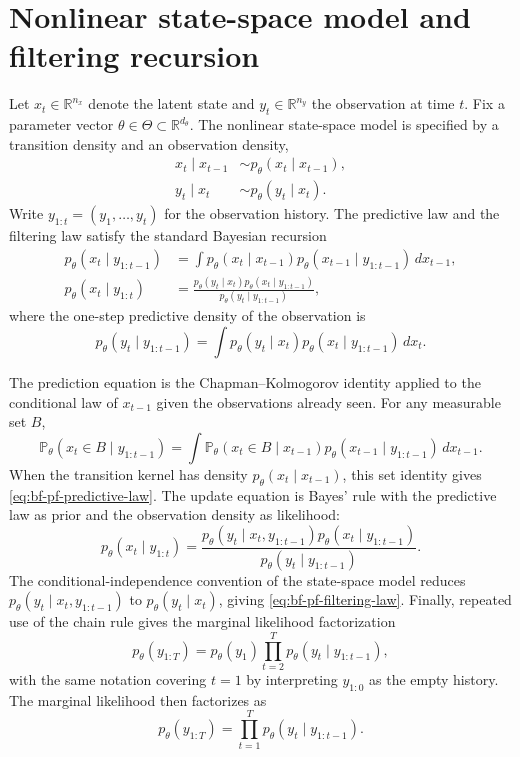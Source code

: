 \section{Nonlinear state-space model and filtering recursion}
\label{sec:bf-pf-ssm-recursion}

Let $x_t \in \mathbb{R}^{n_x}$ denote the latent state and
$y_t \in \mathbb{R}^{n_y}$ the observation at time $t$.  Fix a parameter vector
$\theta \in \Theta \subset \mathbb{R}^{d_\theta}$.  The nonlinear state-space
model is specified by a transition density and an observation density,
\begin{align}
\label{eq:bf-pf-transition-density}
  x_t \mid x_{t-1} &\sim p_\theta(x_t \mid x_{t-1}), \\
\label{eq:bf-pf-observation-density}
  y_t \mid x_t &\sim p_\theta(y_t \mid x_t).
\end{align}
Write $y_{1:t}=(y_1,\ldots,y_t)$ for the observation history.  The predictive
law and the filtering law satisfy the standard Bayesian recursion
\begin{align}
\label{eq:bf-pf-predictive-law}
  p_\theta(x_t \mid y_{1:t-1})
  &= \int p_\theta(x_t \mid x_{t-1})
     p_\theta(x_{t-1} \mid y_{1:t-1})\,dx_{t-1}, \\
\label{eq:bf-pf-filtering-law}
  p_\theta(x_t \mid y_{1:t})
  &= \frac{p_\theta(y_t \mid x_t)
           p_\theta(x_t \mid y_{1:t-1})}
          {p_\theta(y_t \mid y_{1:t-1})},
\end{align}
where the one-step predictive density of the observation is
\begin{equation}
\label{eq:bf-pf-predictive-observation}
  p_\theta(y_t \mid y_{1:t-1})
  = \int p_\theta(y_t \mid x_t)
      p_\theta(x_t \mid y_{1:t-1})\,dx_t.
\end{equation}

The prediction equation is the Chapman--Kolmogorov identity applied to the
conditional law of $x_{t-1}$ given the observations already seen.  For any
measurable set $B$,
\[
  \mathbb{P}_\theta(x_t\in B\mid y_{1:t-1})
  =
  \int \mathbb{P}_\theta(x_t\in B\mid x_{t-1})
       p_\theta(x_{t-1}\mid y_{1:t-1})\,dx_{t-1}.
\]
When the transition kernel has density $p_\theta(x_t\mid x_{t-1})$, this set
identity gives \eqref{eq:bf-pf-predictive-law}.  The update equation is Bayes'
rule with the predictive law as prior and the observation density as
likelihood:
\[
  p_\theta(x_t\mid y_{1:t})
  =
  \frac{p_\theta(y_t\mid x_t,y_{1:t-1})
        p_\theta(x_t\mid y_{1:t-1})}
       {p_\theta(y_t\mid y_{1:t-1})}.
\]
The conditional-independence convention of the state-space model reduces
$p_\theta(y_t\mid x_t,y_{1:t-1})$ to $p_\theta(y_t\mid x_t)$, giving
\eqref{eq:bf-pf-filtering-law}.  Finally, repeated use of the chain rule gives
the marginal likelihood factorization
\[
  p_\theta(y_{1:T})
  =
  p_\theta(y_1)\prod_{t=2}^T p_\theta(y_t\mid y_{1:t-1}),
\]
with the same notation covering $t=1$ by interpreting $y_{1:0}$ as the empty
history.
The marginal likelihood then factorizes as
\begin{equation}
\label{eq:bf-pf-marginal-factorization}
  p_\theta(y_{1:T})
  = \prod_{t=1}^T p_\theta(y_t \mid y_{1:t-1}).
\end{equation}

